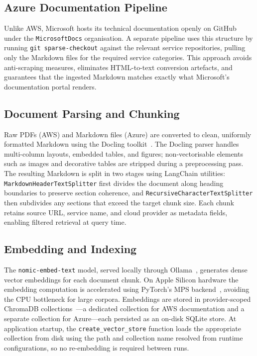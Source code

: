 \subsection{Azure Documentation Pipeline}

Unlike AWS, Microsoft hosts its technical documentation openly on GitHub under the \texttt{MicrosoftDocs} organisation. A separate pipeline uses this structure by running \texttt{git sparse-checkout} against the relevant service repositories, pulling only the Markdown files for the required service categories. This approach avoids anti-scraping measures, eliminates HTML-to-text conversion artefacts, and guarantees that the ingested Markdown matches exactly what Microsoft's documentation portal renders.

\subsection{Document Parsing and Chunking}

Raw PDFs (AWS) and Markdown files (Azure) are converted to clean, uniformly formatted Markdown using the Docling toolkit~\cite{docling2025paper, docling2024web}. The Docling parser handles multi-column layouts, embedded tables, and figures; non-vectorisable elements such as images and decorative tables are stripped during a preprocessing pass. The resulting Markdown is split in two stages using LangChain utilities: \texttt{MarkdownHeaderTextSplitter} first divides the document along heading boundaries to preserve section coherence, and \texttt{RecursiveCharacterTextSplitter} then subdivides any sections that exceed the target chunk size. Each chunk retains source URL, service name, and cloud provider as metadata fields, enabling filtered retrieval at query time.

\subsection{Embedding and Indexing}

The \texttt{nomic-embed-text} model, served locally through Ollama~\cite{ollama2024web}, generates dense vector embeddings for each document chunk. On Apple Silicon hardware the embedding computation is accelerated using PyTorch's MPS backend~\cite{apple2024mps}, avoiding the CPU bottleneck for large corpora. Embeddings are stored in provider-scoped ChromaDB collections~\cite{chromadb2024}---a dedicated collection for AWS documentation and a separate collection for Azure---each persisted as an on-disk SQLite store. At application startup, the \texttt{create\_vector\_store} function loads the appropriate collection from disk using the path and collection name resolved from runtime configurations, so no re-embedding is required between runs.

